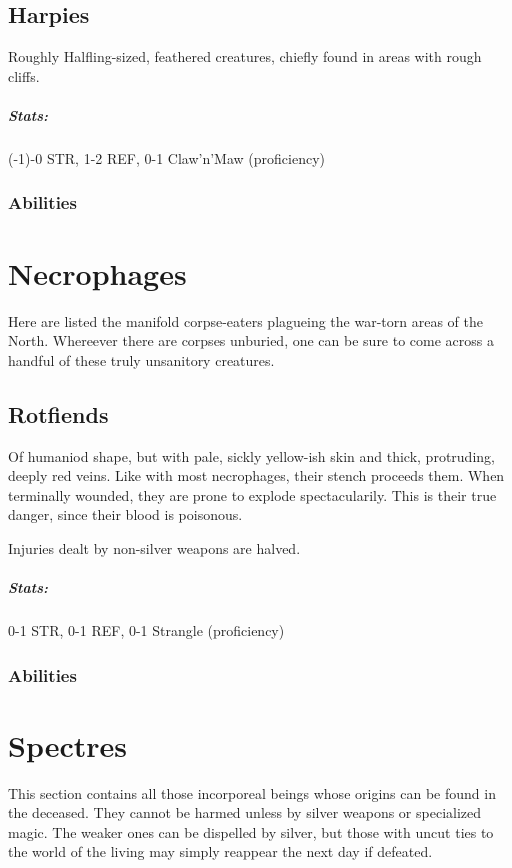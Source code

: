 \documentclass[parskip=full,11pt]{scrreport}
\begin{document}
\subsection{Harpies}
Roughly Halfling-sized, feathered creatures, chiefly found in areas with rough cliffs.

\subparagraph{Stats:}
(-1)-0 STR, 1-2 REF, 0-1 Claw'n'Maw (proficiency)

\subsubsection{Abilities}


\section{Necrophages}
Here are listed the manifold corpse-eaters plagueing the war-torn areas of the North. Whereever there
are corpses unburied, one can be sure to come across a handful of these truly unsanitory creatures.

\subsection{Rotfiends}
Of humaniod shape, but with pale, sickly yellow-ish skin and thick, protruding, deeply red veins. Like
with most necrophages, their stench proceeds them. When terminally wounded, they are prone to explode
spectacularily. This is their true danger, since their blood is poisonous.

Injuries dealt by non-silver weapons are halved.

\subparagraph{Stats:}
0-1 STR, 0-1 REF, 0-1 Strangle (proficiency)

\subsubsection{Abilities}


\section{Spectres}\label{monster:spectre}
This section contains all those incorporeal beings whose origins can be found in the deceased. They cannot be
harmed unless by silver weapons or specialized magic. The weaker ones can be dispelled by silver, but those
with uncut ties to the world of the living may simply reappear the next day if defeated.
\end{document}
